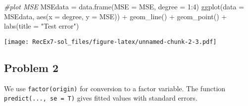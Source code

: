 \documentclass[
]{article}
\newenvironment{Shaded}{\begin{snugshade}}{\end{snugshade}}
\newcommand{\AttributeTok}[1]{\textcolor[rgb]{0.77,0.63,0.00}{#1}}
\newcommand{\CommentTok}[1]{\textcolor[rgb]{0.56,0.35,0.01}{\textit{#1}}}
\newcommand{\DecValTok}[1]{\textcolor[rgb]{0.00,0.00,0.81}{#1}}
\newcommand{\FunctionTok}[1]{\textcolor[rgb]{0.00,0.00,0.00}{#1}}
\newcommand{\NormalTok}[1]{#1}
\newcommand{\OtherTok}[1]{\textcolor[rgb]{0.56,0.35,0.01}{#1}}
\newcommand{\SpecialCharTok}[1]{\textcolor[rgb]{0.00,0.00,0.00}{#1}}
\newcommand{\StringTok}[1]{\textcolor[rgb]{0.31,0.60,0.02}{#1}}
\begin{document}
\begin{Shaded}
\begin{Highlighting}[]
\CommentTok{\#plot MSE}
\NormalTok{MSEdata }\OtherTok{=} \FunctionTok{data.frame}\NormalTok{(}\AttributeTok{MSE =}\NormalTok{ MSE, }\AttributeTok{degree =} \DecValTok{1}\SpecialCharTok{:}\DecValTok{4}\NormalTok{)}
\FunctionTok{ggplot}\NormalTok{(}\AttributeTok{data =}\NormalTok{ MSEdata, }\FunctionTok{aes}\NormalTok{(}\AttributeTok{x =}\NormalTok{ degree, }\AttributeTok{y =}\NormalTok{ MSE)) }\SpecialCharTok{+} 
  \FunctionTok{geom\_line}\NormalTok{() }\SpecialCharTok{+} 
  \FunctionTok{geom\_point}\NormalTok{() }\SpecialCharTok{+} 
  \FunctionTok{labs}\NormalTok{(}\AttributeTok{title =} \StringTok{"Test error"}\NormalTok{)}
\end{Highlighting}
\end{Shaded}

\texttt{[image: RecEx7-sol\_files/figure-latex/unnamed-chunk-2-3.pdf]}

\hypertarget{problem-2}{%
\subsection{Problem 2}\label{problem-2}}

We use \texttt{factor(origin)} for conversion to a factor variable. The
function \texttt{predict(...,\ se\ =\ T)} gives fitted values with
standard errors.
\end{document}
